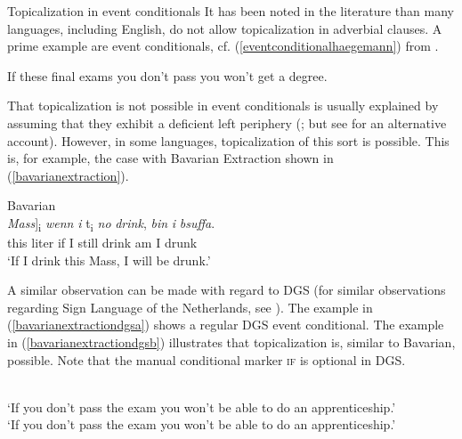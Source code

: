 
\begin{digression}{Topicalization in event conditionals}{}
\noindent It has been noted in the literature than many languages, including English, do not allow topicalization in adverbial clauses. A prime example are event conditionals, cf. (\ref{eventconditionalhaegemann}) from \citet[332]{haegeman2003conditional}.

\begin{exe}
\ex *If these final exams you don't pass you won't get a degree. \label{eventconditionalhaegemann}
\end{exe}

\noindent That topicalization is not possible in event conditionals is usually explained by assuming that they exhibit a deficient left periphery (\citealt{haegeman2003conditional, haegeman2004topicalization}; but see \citealt{haegeman2013syntax} for an alternative account). However, in some languages, topicalization of this sort is possible. This is, for example, the case with Bavarian Extraction shown in (\ref{bavarianextraction}).

\begin{exe}
\ex Bavarian \citep[232]{grewendorf2015bavarian} \\ \gll {[\textit{De}} {\textit{Mass}]\textsubscript{i}} {\textit{wenn}} {\textit{i}} {t\textsubscript{i}} {\textit{no}} {\textit{drink},} {\textit{bin}} {\textit{i}} {\textit{bsuffa}.}   \\
{this} {liter} {if} {I} {} {still} {drink} {am} {I} {drunk} \\
\trans `If I drink this Mass, I will be drunk.'   \label{bavarianextraction}
\end{exe}

\noindent A similar observation can be made with regard to DGS (for similar observations regarding Sign Language of the Netherlands, see \citealt{pfau2008topics}). The example in (\ref{bavarianextractiondgsa}) shows a regular DGS event conditional. The example in (\ref{bavarianextractiondgsb}) illustrates that topicalization is, similar to Bavarian, possible. Note that the manual conditional marker \textsc{if} is optional in DGS.

\newpage
\vspace*{-1.5\baselineskip}
\begin{exe}
\ex\begin{xlist}  \label{bavarianextractiondgs}
\ex {}  \\
`If you don't pass the exam you won't be able to do an apprenticeship.' \label{bavarianextractiondgsa}
\ex {}   \\
`If you don't pass the exam you won't be able to do an apprenticeship.' \label{bavarianextractiondgsb}
\end{xlist}
\end{exe}


\end{digression}

